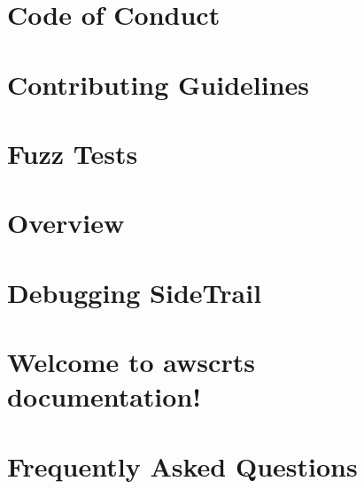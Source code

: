 \documentclass[twoside]{book}
\newcommand{\+}{\discretionary{\mbox{\scriptsize$\hookleftarrow$}}{}{}}
\begin{document}
\chapter{Code of Conduct}
\label{md_crt_aws_crt_cpp_crt_s2n_tests_cbmc_templates__c_o_d_e__o_f__c_o_n_d_u_c_t}

\chapter{Contributing Guidelines}
\label{md_crt_aws_crt_cpp_crt_s2n_tests_cbmc_templates__c_o_n_t_r_i_b_u_t_i_n_g}

\chapter{Fuzz Tests}
\label{md_crt_aws_crt_cpp_crt_s2n_tests_fuzz__readme}

\chapter{Overview}
\label{md_crt_aws_crt_cpp_crt_s2n_tests_pems_ocsp__o_c_s_p__t_e_s_t}

\chapter{Debugging Side\+Trail}
\label{md_crt_aws_crt_cpp_crt_s2n_tests_sidetrail__d_e_b_u_g_g_i_n_g}

\chapter{Welcome to awscrt\textquotesingle{}s documentation!}
\label{md_crt_aws_crt_cpp_docsrc_index}

\chapter{Frequently Asked Questions}
\label{md__f_a_q}

\end{document}
